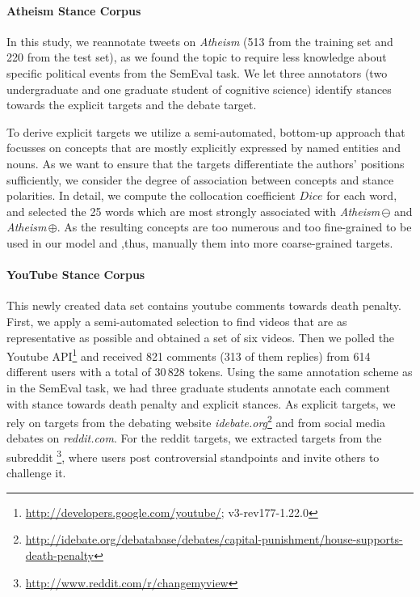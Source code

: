 \documentclass[11pt]{article}
\begin{document}
\paragraph{Atheism Stance Corpus \cite{wojatzki2016}}
In this study, we reannotate tweets on \textit{Atheism} (513 from the training set and 220 from the test set), as we found the topic to require less knowledge about specific political events from the SemEval task.
We let three annotators (two undergraduate and one graduate student of cognitive science) identify stances towards the explicit targets and the debate target.

To derive explicit targets we utilize a semi-automated, bottom-up approach that focusses on concepts that are mostly explicitly expressed by named entities and nouns.
As we want to ensure that the targets differentiate the authors' positions sufficiently, we consider the degree of association between concepts and stance polarities.
In detail, we compute the collocation coefficient $Dice$ \cite{smadja1996translating} for each word, and selected the 25 words which are most strongly associated with \textit{Atheism}\,$\ominus$ and \textit{Atheism}\,$\oplus$.
As the resulting concepts are too numerous and too fine-grained to be used in our model and ,thus, manually them into more coarse-grained targets.

\paragraph{YouTube Stance Corpus \cite{wojatzki2017youtube}}
This newly created data set contains youtube comments towards death penalty.
First, we apply a semi-automated selection to find videos that are as representative as possible and obtained a set of six videos.
Then we polled the Youtube API\footnote{\url{http://developers.google.com/youtube/}; v3-rev177-1.22.0} and received 821 comments (313 of them replies) from 614 different users with a total of 30\,828 tokens.
Using the same annotation scheme as in the SemEval task, we had three graduate students annotate each comment with stance towards death penalty and explicit stances.
As explicit targets, we rely on targets from the debating website \textit{\mbox{idebate.org}}\footnote{\url{http://idebate.org/debatabase/debates/capital-punishment/house-supports-death-penalty}} and from social media debates on \textit{\mbox{reddit.com}}.
For the reddit targets, we extracted targets from the subreddit \footnote{\url{http://www.reddit.com/r/changemyview}}, where users post controversial standpoints and invite others to challenge it.
\end{document}
